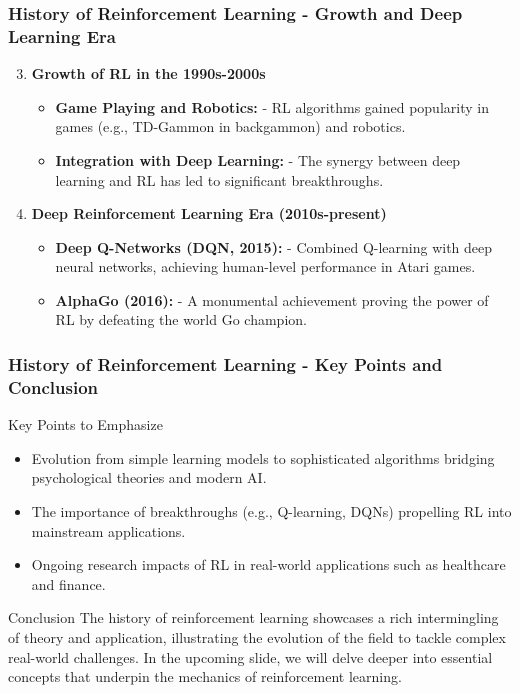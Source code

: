 \documentclass[aspectratio=169]{beamer}
\begin{document}
\begin{frame}[fragile]
    \frametitle{History of Reinforcement Learning - Growth and Deep Learning Era}
    \begin{enumerate}
        \setcounter{enumi}{2} %
        \item \textbf{Growth of RL in the 1990s-2000s}
        \begin{itemize}
            \item \textbf{Game Playing and Robotics:}
            - RL algorithms gained popularity in games (e.g., TD-Gammon in backgammon) and robotics.
            \item \textbf{Integration with Deep Learning:}
            - The synergy between deep learning and RL has led to significant breakthroughs.
        \end{itemize}
        
        \item \textbf{Deep Reinforcement Learning Era (2010s-present)}
        \begin{itemize}
            \item \textbf{Deep Q-Networks (DQN, 2015):}
            - Combined Q-learning with deep neural networks, achieving human-level performance in Atari games.
            \item \textbf{AlphaGo (2016):}
            - A monumental achievement proving the power of RL by defeating the world Go champion.
        \end{itemize}
    \end{enumerate}
\end{frame}

\begin{frame}[fragile]
    \frametitle{History of Reinforcement Learning - Key Points and Conclusion}
    \begin{block}{Key Points to Emphasize}
        \begin{itemize}
            \item Evolution from simple learning models to sophisticated algorithms bridging psychological theories and modern AI.
            \item The importance of breakthroughs (e.g., Q-learning, DQNs) propelling RL into mainstream applications.
            \item Ongoing research impacts of RL in real-world applications such as healthcare and finance.
        \end{itemize}
    \end{block}
    
    \begin{block}{Conclusion}
        The history of reinforcement learning showcases a rich intermingling of theory and application, illustrating the evolution of the field to tackle complex real-world challenges. In the upcoming slide, we will delve deeper into essential concepts that underpin the mechanics of reinforcement learning.
    \end{block}
\end{frame}
\end{document}
